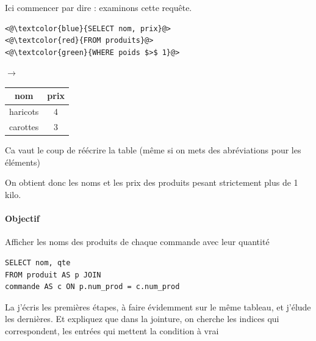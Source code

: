 \begin{com}
	Ici commencer par dire : examinons cette requête.
\end{com}

\begin{lstlisting}
<@\textcolor{blue}{SELECT nom, prix}@>
<@\textcolor{red}{FROM produits}@>
<@\textcolor{green}{WHERE poids $>$ 1}@>
\end{lstlisting}

 \qquad $\longrightarrow$ \qquad \begin{tabular}{|c|c|}
	\multicolumn{1}{c}{nom} & \multicolumn{1}{c}{prix} \\ \hline
	haricots & 4 \\ \hline
	carottes & 3 \\ \hline
\end{tabular} 

\begin{com}
	Ca vaut le coup de réécrire la table (même si on mets des abréviations pour les éléments)
\end{com}

On obtient donc les noms et les prix des produits pesant strictement plus de 1 kilo.


\paragraph{Objectif} Afficher les noms des produits de chaque commande avec leur quantité

\begin{lstlisting}
SELECT nom, qte
FROM produit AS p JOIN
commande AS c ON p.num_prod = c.num_prod
\end{lstlisting}

\begin{com}
	La j'écris les premières étapes, à faire évidemment sur le même tableau, et j'élude les dernières. Et expliquez que dans la jointure, on cherche les indices qui correspondent, les entrées qui mettent la condition à vrai
\end{com}

